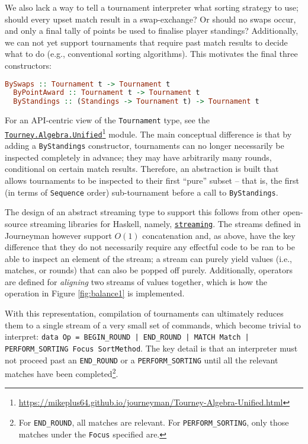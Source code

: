 \documentclass[a4,11pt,twoside,final,hidelinks]{article}
\begin{document}
We also lack a way to tell a tournament interpreter what sorting strategy to
use; should every upset match result in a swap-exchange? Or should no swaps
occur, and only a final tally of points be used to finalise player standings?
Additionally, we can not yet support tournaments that require past match results
to decide what to do (e.g., conventional sorting algorithms). This motivates the
final three constructors:

\begin{lstlisting}[language=haskell,numbers=none]
  BySwaps :: Tournament t -> Tournament t
  ByPointAward :: Tournament t -> Tournament t
  ByStandings :: (Standings -> Tournament t) -> Tournament t
\end{lstlisting}

For an API-centric view of the \texttt{Tournament} type, see the
\href{https://mikeplus64.github.io/journeyman/Tourney-Algebra-Unified.html}{ \texttt{Tourney.Algebra.Unified}}\footnote{\url{https://mikeplus64.github.io/journeyman/Tourney-Algebra-Unified.html}} module. The main conceptual difference is that by
adding a \texttt{ByStandings} constructor, tournaments can no longer necessarily be
inspected completely in advance; they may have arbitrarily many rounds,
conditional on certain match results. Therefore, an abstraction is built that
allows tournaments to be inspected to their first ``pure'' subset -- that is, the
first (in terms of \texttt{Sequence} order) sub-tournament before a call to
\texttt{ByStandings}.

The design of an abstract streaming type to support this follows from other
open-source streaming libraries for Haskell, namely, \href{https://hackage.haskell.org/package/streaming}{\texttt{streaming}}. The streams
defined in Journeyman however support \(O(1)\) concatenation and, as above, have
the key difference that they do not necessarily require any effectful code to be
ran to be able to inspect an element of the stream; a stream can purely yield
values (i.e., matches, or rounds) that can also be popped off purely.
Additionally, operators are defined for \emph{aligning} two streams of values
together, which is how the operation in Figure \ref{fig:balance1} is implemented.

With this representation, compilation of tournaments can ultimately reduces them
to a single stream of a very small set of commands, which become trivial to
interpret: \texttt{data Op = BEGIN\_ROUND | END\_ROUND | MATCH Match | PERFORM\_SORTING
Focus SortMethod}. The key detail is that an interpreter must not proceed past
an \texttt{END\_ROUND} or a \texttt{PERFORM\_SORTING} until all the relevant matches have been
completed\footnote{For \texttt{END\_ROUND}, all matches are relevant. For \texttt{PERFORM\_SORTING},
only those matches under the \texttt{Focus} specified are.}.
\end{document}
